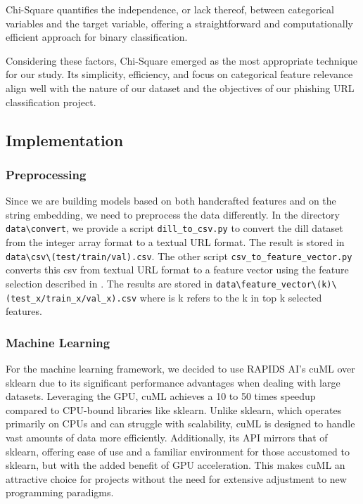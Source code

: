 \documentclass{article}
\begin{document}
    Chi-Square quantifies the independence, or lack thereof, between categorical variables and the target variable, offering a straightforward and computationally efficient approach for binary classification.

    Considering these factors, Chi-Square emerged as the most appropriate technique for our study.
    Its simplicity, efficiency, and focus on categorical feature relevance align well with the nature of our dataset and the objectives of our phishing URL classification project.



    \subsection{Implementation}\label{subsec:implementation}

    \subsubsection{Preprocessing}\label{subsubsec:preprocessing}
    Since we are building models based on both handcrafted features and on the string embedding, we need to preprocess the data differently.
    In the directory \texttt{data\textbackslash convert}, we provide a script \texttt{dill\_to\_csv.py} to convert the dill dataset from the integer array format to a textual URL format.
    The result is stored in \texttt{data\textbackslash csv\textbackslash (test/train/val).csv}.
    The other script \texttt{csv\_to\_feature\_vector.py} converts this csv from textual URL format to a feature vector using the feature selection described in .
    The results are stored in \texttt{data\textbackslash feature\_vector\textbackslash (k)\textbackslash (test\_x/train\_x/val\_x).csv} where is k refers to the k in top k selected features.

    \subsubsection{Machine Learning}
    For the machine learning framework, we decided to use RAPIDS AI’s cuML over sklearn due to its significant performance advantages when dealing with large datasets.
    Leveraging the GPU, cuML achieves a 10 to 50 times speedup compared to CPU-bound libraries like sklearn.
    Unlike sklearn, which operates primarily on CPUs and can struggle with scalability, cuML is designed to handle vast amounts of data more efficiently.
    Additionally, its API mirrors that of sklearn, offering ease of use and a familiar environment for those accustomed to sklearn, but with the added benefit of GPU acceleration.
    This makes cuML an attractive choice for projects without the need for extensive adjustment to new programming paradigms.
\end{document}
